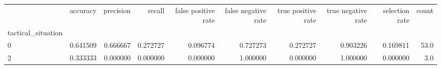 \begin{tabular}{lrrrrrrrrr}
\toprule
{} &  accuracy &  precision &    recall &  false positive rate &  false negative rate &  true positive rate &  true negative rate &  selection rate &  count \\
tactical\_situation &           &            &           &                      &                      &                     &                     &                 &        \\
\midrule
0                  &  0.641509 &   0.666667 &  0.272727 &             0.096774 &             0.727273 &            0.272727 &            0.903226 &        0.169811 &   53.0 \\
2                  &  0.333333 &   0.000000 &  0.000000 &             0.000000 &             1.000000 &            0.000000 &            1.000000 &        0.000000 &    3.0 \\
\bottomrule
\end{tabular}
